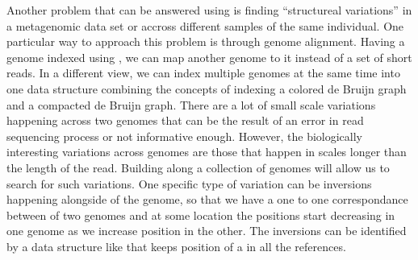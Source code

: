 Another problem that can be answered using \pufferfish is finding ``structureal variations'' in a metagenomic data set or accross different samples of the same individual. One particular way to approach this problem is through genome alignment. Having a genome indexed using \pufferfish, we can map another genome to it instead of a set of short reads. In a different view, we can index multiple genomes at the same time into one data structure combining the concepts of indexing a colored de Bruijn graph and a compacted de Bruijn graph. There are a lot of small scale variations happening across two genomes that can be the result of an error in read sequencing process or not informative enough. However, the biologically interesting variations across genomes are those that happen in scales longer than the length of the read. Building \pufferfish along a collection of genomes will allow us to search for such variations. One specific type of variation can be inversions happening alongside of the genome, so that we have a one to one correspondance between \kmers of two genomes and at some location the positions start decreasing in one genome as we increase position in the other. The inversions can be identified by a data structure like \pufferfish that keeps position of a \kmer in all the references.


